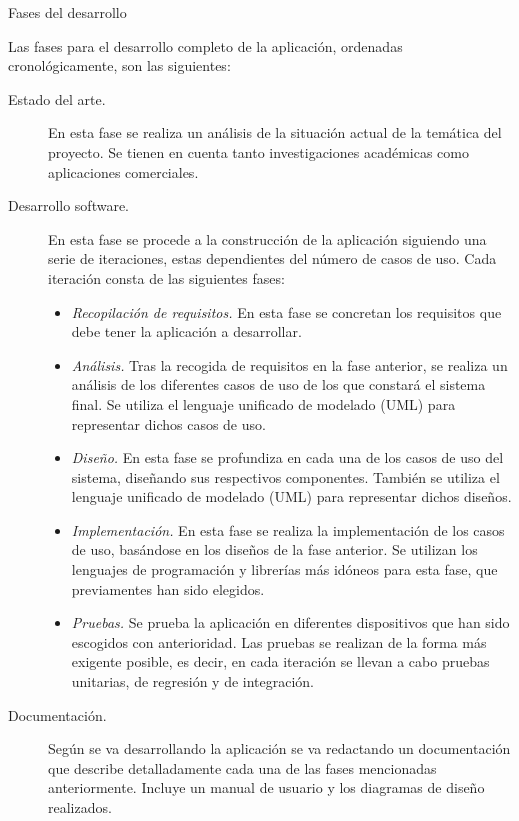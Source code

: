 \documentclass[12pt,a4paper,spanish,oneside]{report}
\makeatletter
\renewcommand{\subsection}{
  \@startsection{subsection}{2}{0mm}{2mm}
  {4.0mm}{\Large\bf}
}
\theoremstyle{plain} \newtheorem{nota}{Nota}
\makeatother
\begin{document}
\subsection{Fases del desarrollo}
\begin{spacing}{1.5}
Las fases para el desarrollo completo de la aplicación, ordenadas 
cronológicamente, son las siguientes:
\begin{description}
\item [Estado del arte.] En esta fase se realiza un análisis de la situación 
actual de la temática del proyecto. Se tienen en cuenta tanto investigaciones 
académicas como aplicaciones comerciales.
\item [Desarrollo software.] En esta fase se procede a la construcción de la 
aplicación siguiendo una serie de iteraciones, estas dependientes del número de
casos de uso. Cada iteración consta de las siguientes fases:
\begin{itemize}
\item \emph{Recopilación de requisitos.} En esta fase se concretan los 
requisitos que debe tener la aplicación a desarrollar.
\item \emph{Análisis.} Tras la recogida de requisitos en la fase anterior, se
realiza un análisis de los diferentes casos de uso de los que constará el 
sistema final. Se utiliza el lenguaje unificado de modelado (UML) para 
representar dichos casos de uso.
\item \emph{Diseño.} En esta fase se profundiza en cada una de los casos de uso
del sistema, diseñando sus respectivos componentes. También se utiliza el 
lenguaje unificado de modelado (UML) para representar dichos diseños.
\item \emph{Implementación.} En esta fase se realiza la implementación de los 
casos de uso, basándose en los diseños de la fase anterior. Se utilizan los 
lenguajes de programación y librerías más idóneos para esta fase, que 
previamentes han sido elegidos.
\item \emph{Pruebas.} Se prueba la aplicación en diferentes dispositivos que 
han sido escogidos con anterioridad. Las pruebas se realizan de la forma más 
exigente posible, es decir, en cada iteración se llevan a cabo pruebas 
unitarias, de regresión y de integración.
\end{itemize}
\item[Documentación.] Según se va desarrollando la aplicación se va redactando
un documentación que describe detalladamente cada una de las fases mencionadas
anteriormente. Incluye un manual de usuario y los diagramas de diseño 
realizados.
\end{description}
\end{spacing}
\end{document}
